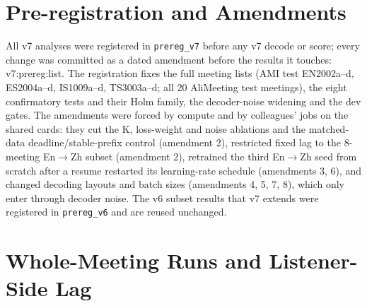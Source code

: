 \section{Pre-registration and Amendments}
\label{app:prereg}

All v7 analyses were registered in \texttt{prereg\_v7} before any v7 decode or score; every change was committed as a
dated amendment before the results it touches: \num{v7:prereg:list}. The registration fixes the full meeting lists
(AMI test EN2002a--d, ES2004a--d, IS1009a--d, TS3003a--d; all 20 AliMeeting test meetings), the eight confirmatory tests
and their Holm family, the decoder-noise widening and the dev gates. The amendments were forced by compute and by
colleagues' jobs on the shared cards: they cut the K, loss-weight and noise ablations and the matched-data
deadline/stable-prefix control (amendment 2), restricted fixed lag to the 8-meeting En$\rightarrow$Zh subset
(amendment 2), retrained the third En$\rightarrow$Zh seed from scratch after a resume restarted its learning-rate schedule
(amendments 3, 6), and changed decoding layouts and batch sizes (amendments 4, 5, 7, 8), which only enter through decoder
noise. The v6 subset results that v7 extends were registered in \texttt{prereg\_v6} and are reused unchanged.

\section{Whole-Meeting Runs and Listener-Side Lag}
\label{app:online}
\label{app:online7}





